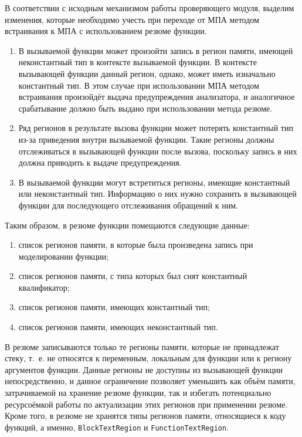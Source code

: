 В соответствии с исходным механизмом работы проверяющего модуля, выделим изменения, которые необходимо учесть при переходе от МПА методом встраивания к МПА с использованием резюме функции.

\begin{enumerate}
 \item В вызываемой функции может произойти запись в регион памяти, имеющей неконстантный тип в контексте вызываемой функции. В контексте вызывающей функции данный регион, однако, может иметь изначально константный тип. В этом случае при использовании МПА методом встраивания произойдёт выдача предупреждения анализатора, и аналогичное срабатывание должно быть выдано при использовании метода резюме.
 \item Ряд регионов в результате вызова функции может потерять константный тип из-за приведения внутри вызываемой функции. Такие регионы должны отслеживаться в вызывающей функции после вызова, поскольку запись в них должна приводить к выдаче предупреждения.
 \item В вызываемой функции могут встретиться регионы, имеющие константный или неконстантный тип. Информацию о них нужно сохранить в вызывающей функции для последующего отслеживания обращений к ним.
\end{enumerate}

Таким образом, в резюме функции помещаются следующие данные:

\begin{enumerate}
 \item список регионов памяти, в которые была произведена запись при моделировании функции;
 \item список регионов памяти, с типа которых был снят константный квалификатор;
 \item список регионов памяти, имеющих константный тип;
 \item список регионов памяти, имеющих неконстантный тип.
\end{enumerate}

В резюме записываются только те регионы памяти, которые не принадлежат стеку, т.~е. не относятся к переменным, локальным для функции или к региону аргументов функции. Данные регионы не доступны из вызывающей функции непосредственно, и данное ограничение позволяет уменьшить как объём памяти, затрачиваемой на хранение резюме функции, так и избегать потенциально ресурсоёмкой работы по актуализации этих регионов при применении резюме. Кроме того, в резюме не хранятся типы регионов памяти, относящиеся к коду функций, а именно, \texttt{BlockTextRegion} и \texttt{FunctionTextRegion}.

